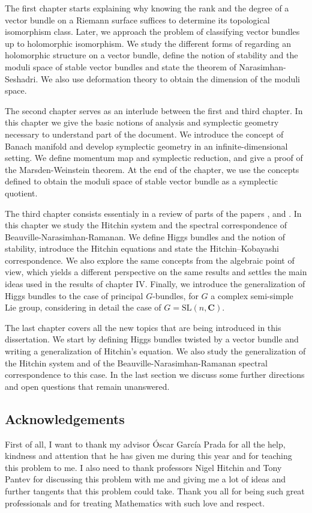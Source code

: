 \documentclass[12pt,a4paper]{book}
\theoremstyle{definition} \newtheorem{defn}[thm]{Definition}
\theoremstyle{definition} \newtheorem{ejemplo}[thm]{Example}
\theoremstyle{remark} \newtheorem{rem}[thm]{Remark}
\def\CC{\mathbf{C}}
\def\SL{\mathrm{SL}}
\begin{document}
The first chapter starts explaining why knowing the rank and the degree of a vector bundle on a Riemann surface suffices to determine its topological isomorphism class. Later, we approach the problem of classifying vector bundles up to holomorphic isomorphism. We study the different forms of regarding an holomorphic structure on a vector bundle, define the notion of stability and the moduli space of stable vector bundles and state the theorem of Narasimhan-Seshadri. We also use deformation theory to obtain the dimension of the moduli space.

The second chapter serves as an interlude between the first and third chapter. In this chapter we give the basic notions of analysis and symplectic geometry necessary to understand part of the document. We introduce the concept of Banach manifold and develop symplectic geometry in an infinite-dimensional setting. We define momentum map and symplectic reduction, and give a proof of the Marsden-Weinstein theorem. At the end of the chapter, we use the concepts defined to obtain the moduli space of stable vector bundle as a symplectic quotient.

The third chapter consists essentialy in a review of parts of the papers \cite{hitchinselfduality}, \cite{hitchinsystem} and \cite{bnr}. In this chapter we study the Hitchin system and the spectral correspondence of Beauville-Narasimhan-Ramanan. We define Higgs bundles and the notion of stability, introduce the Hitchin equations and state the Hitchin--Kobayashi correspondence. We also explore the same concepts from the algebraic point of view, which yields a different perspective on the same results and settles the main ideas used in the results of chapter IV. Finally, we introduce the generalization of Higgs bundles to the case of principal $G$-bundles, for $G$ a complex semi-simple Lie group, considering in detail the case of $G=\SL(n,\CC)$.

The last chapter covers all the new topics that are being introduced in this dissertation. We start by defining Higgs bundles twisted by a vector bundle and writing a generalization of Hitchin's equation. We also study the generalization of the Hitchin system and of the Beauville-Narasimhan-Ramanan spectral correspondence to this case. In the last section we discuss some further directions and open questions that remain unanswered.

\subsection*{Acknowledgements}
First of all, I want to thank my advisor Óscar García Prada for all the help, kindness and attention that he has given me during this year and for teaching this problem to me. I also need to thank professors Nigel Hitchin and Tony Pantev for discussing this problem with me and giving me a lot of ideas and further tangents that this problem could take. Thank you all for being such great professionals and for treating Mathematics with such love and respect.
\end{document}
